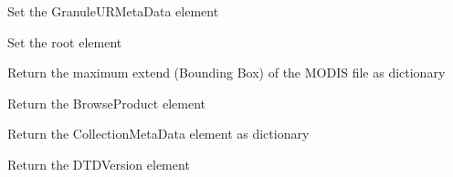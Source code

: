 \documentclass[a4paper,11pt,oneside]{sphinxmanual}
\begin{document}
\begin{fulllineitems}

\begin{fulllineitems}
\label{pymodis/pymodis:pymodis.parsemodis.parseModis.getGranule}
Set the GranuleURMetaData element

\end{fulllineitems}


\begin{fulllineitems}
\label{pymodis/pymodis:pymodis.parsemodis.parseModis.getRoot}
Set the root element

\end{fulllineitems}


\begin{fulllineitems}
\label{pymodis/pymodis:pymodis.parsemodis.parseModis.retBoundary}
Return the maximum extend (Bounding Box) of the MODIS file as
dictionary

\end{fulllineitems}


\begin{fulllineitems}
\label{pymodis/pymodis:pymodis.parsemodis.parseModis.retBrowseProduct}
Return the BrowseProduct element

\end{fulllineitems}


\begin{fulllineitems}
\label{pymodis/pymodis:pymodis.parsemodis.parseModis.retCollectionMetaData}
Return the CollectionMetaData element as dictionary

\end{fulllineitems}


\begin{fulllineitems}
\label{pymodis/pymodis:pymodis.parsemodis.parseModis.retDTD}
Return the DTDVersion element


\end{fulllineitems}
\end{fulllineitems}
\end{document}
